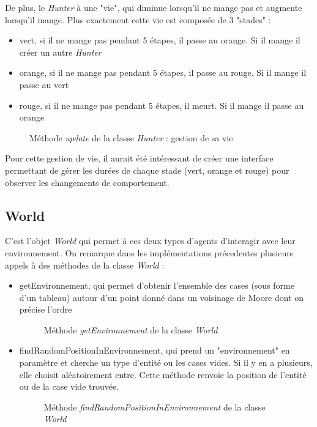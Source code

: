 \documentclass{article}
\begin{document}
De plus, le \emph{Hunter} à une "vie", qui diminue lorsqu'il ne mange pas et
augmente lorsqu'il mange. Plus exactement cette vie est composée de 3 "stades" :
\begin{itemize}
  \item vert, si il ne mange pas pendant 5 étapes, il passe au orange. Si il mange il créer un autre \emph{Hunter}
  \item orange, si il ne mange pas pendant 5 étapes, il passe au rouge. Si il mange il passe au vert
  \item rouge, si il ne mange pas pendant 5 étapes, il meurt. Si il mange il passe au orange
\end{itemize}
\begin{figure}[!h]
  \centering
  \caption{Méthode \emph{update}  de la classe \emph{Hunter} : gestion de sa vie}
  
\end{figure}
Pour cette gestion de vie, il aurait été intéressant de créer une interface permettant de gérer les durées de chaque stade (vert, orange
et rouge) pour observer les changements de comportement.


\newpage
\subsection{World}
C'est l'objet \emph{World} qui permet à ces deux types d'agents d'interagir avec leur environnement. On remarque dans les implémentations
précedentes plusieurs appels à des méthodes de la classe \emph{World} :
\begin{itemize}
  \item getEnvironnement, qui permet d'obtenir l'ensemble des cases (sous forme d'un tableau) autour d'un point donné dans un voisinage de Moore dont on précise l'ordre
  \begin{figure}[!h]
    \centering
    \caption{Méthode \emph{getEnvironnement}  de la classe \emph{World}}
    
  \end{figure}

  \item findRandomPositionInEnvironnement, qui prend un "environnement" en paramètre et cherche un type d'entité ou les cases vides. Si il
  y en a plusieurs, elle choisit aléatoirement entre. Cette méthode renvoie la position de l'entité ou de la case vide trouvée.
  \begin{figure}[!h]
    \centering
    \caption{Méthode \emph{findRandomPositionInEnvironnement}  de la classe \emph{World}}
    
  \end{figure}
\end{itemize}
\end{document}
